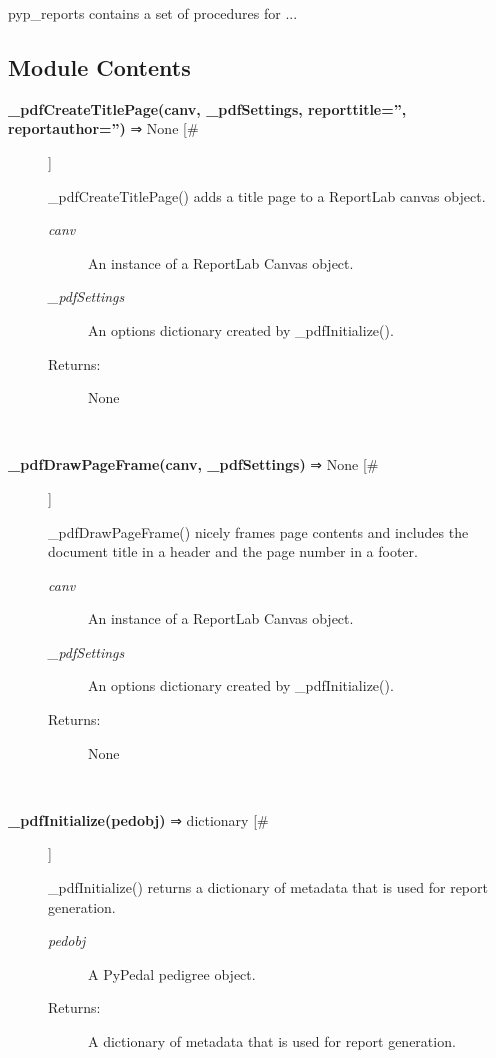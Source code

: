 

 pyp\_reports contains a set of procedures for ...
\subsection*{Module Contents}
\begin{description}
\item[\textbf{\_pdfCreateTitlePage(canv, \_pdfSettings, reporttitle='', reportauthor='')}
 ⇒ None [\#]]

 \_pdfCreateTitlePage() adds a title page to a ReportLab canvas object.
\begin{description}
\item[\emph{canv}
] An instance of a ReportLab Canvas object.
\item[\emph{\_pdfSettings}
] An options dictionary created by \_pdfInitialize().
\item[Returns:] None

\end{description}
\\ 

\item[\textbf{\_pdfDrawPageFrame(canv, \_pdfSettings)}
 ⇒ None [\#]]

 \_pdfDrawPageFrame() nicely frames page contents and includes the document title in a header and the page number in a footer.
\begin{description}
\item[\emph{canv}
] An instance of a ReportLab Canvas object.
\item[\emph{\_pdfSettings}
] An options dictionary created by \_pdfInitialize().
\item[Returns:] None

\end{description}
\\ 

\item[\textbf{\_pdfInitialize(pedobj)}
 ⇒ dictionary [\#]]

 \_pdfInitialize() returns a dictionary of metadata that is used for report generation.
\begin{description}
\item[\emph{pedobj}
] A PyPedal pedigree object.
\item[Returns:] A dictionary of metadata that is used for report generation.

\end{description}
\\ 


\end{description}
